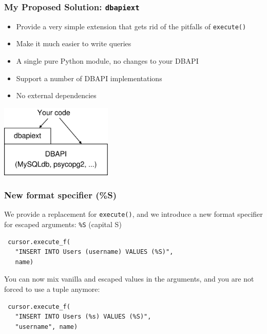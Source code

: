 \documentclass{beamer}
\begin{document}
\begin{frame}[fragile]
  \frametitle{My Proposed Solution: \texttt{dbapiext}}

  \begin{itemize}
  \item Provide a very simple extension that gets rid of the pitfalls of
    \texttt{execute()}
  \item Make it much easier to write queries
  \item A single pure Python module, no changes to your DBAPI
  \item Support a number of DBAPI implementations
  \item No external dependencies
  \end{itemize}

  \begin{center}
    \includegraphics[width=0.4\textwidth]{layer.pdf}
  \end{center}

\end{frame}



\begin{frame}[fragile]
  \frametitle{New format specifier (\%S)}

  We provide a replacement for \texttt{execute()}, and we introduce a new format
  specifier for escaped arguments: \texttt{\%S} (capital S)

\begin{verbatim}
 cursor.execute_f(
   "INSERT INTO Users (username) VALUES (%S)",
   name)
\end{verbatim}

  You can now mix vanilla and escaped values in the arguments, and you are not
  forced to use a tuple anymore:
\begin{verbatim}
 cursor.execute_f(
   "INSERT INTO Users (%s) VALUES (%S)",
   "username", name)
\end{verbatim}

\end{frame}
\end{document}
